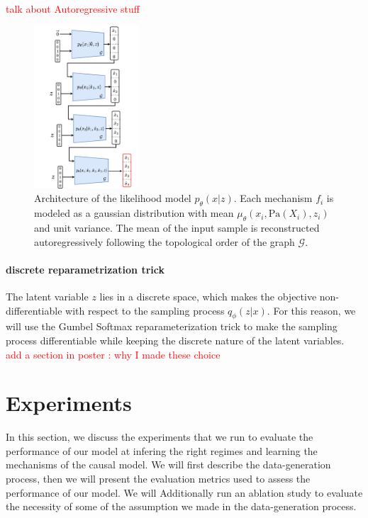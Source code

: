 \documentclass{article}
\newcommand\todo[1]{\textcolor{red}{#1}}
\begin{document}
\todo{talk about Autoregressive stuff}
\begin{figure}
\centering
    \includegraphics[width=0.35\textwidth]{images/architecture_decoder.pdf}
    \caption{Architecture of the likelihood model $p_\theta(x | z)$. Each mechanism $f_i$ is modeled as a gaussian distribution with mean $\mu_\theta(x_i, \text{Pa}(X_i), z_i)$ and unit variance. The mean of the input sample is reconstructed autoregressively following the topological order of the graph $\mathcal{G}$.}
    \label{fig:architecture_decoder}
\end{figure}
\paragraph{discrete reparametrization trick}
The latent variable $z$ lies in a discrete space, which makes the objective non-differentiable with respect to the sampling process $q_\phi(z | x)$. For this reason, we will use the Gumbel Softmax reparameterization trick \citep{jang2017categoricalreparameterizationgumbelsoftmax} to make the sampling process differentiable while keeping the discrete nature of the latent variables.
 \todo{add a section in poster  : why I made these choice}
\section{Experiments}\label{subsec:Experiments}
In this section, we discuss the experiments that we run to evaluate the performance of our model at infering the right regimes and learning the mechanisms of the causal model. We will first describe the data-generation process, then we will present the evaluation metrics used to assess the performance of our model. We will Additionally run an ablation study to evaluate the necessity of some of the assumption we made in the data-generation process.
\end{document}
